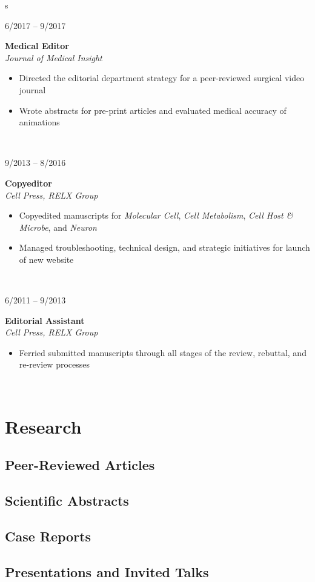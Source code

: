s\documentclass{article}
\newcommand\colleft{.20}
\newcommand\colright{.75}
\newcommand{\entryfour}[4]
	{
		\begin{minipage}[t]{\colleft\textwidth}
		\hfill \textsc{#1}
		\end{minipage}
		\hfill\vline\hfill
		\begin{minipage}[t]{\colright\textwidth}
		{\bf#2}\\
		\textit{#3}
		\footnotesize{#4}
		\end{minipage}\\
		\entryvspace
	}%
\newcommand{\entryvspace}{\vspace{0.5em}}
\begin{document}
		\entryfour{6/2017 -- 9/2017}{Medical Editor}{Journal of Medical Insight}{%
		\begin{itemize}
			\item Directed the editorial department strategy for a peer-reviewed surgical video journal
			\item Wrote abstracts for pre-print articles and evaluated medical accuracy of animations
		\end{itemize}
		}
		
		\entryfour{9/2013 -- 8/2016}{Copyeditor}{Cell Press, RELX Group}{%
			\begin{itemize}
				\item Copyedited manuscripts for \emph{Molecular Cell}, \emph{Cell Metabolism}, \emph{Cell Host \& Microbe}, and \emph{Neuron}
				\item Managed troubleshooting, technical design, and strategic initiatives for launch of new website 
			\end{itemize}
		}
		
		\entryfour{6/2011 -- 9/2013}{Editorial Assistant}{Cell Press, RELX Group}{%
			\begin{itemize}
				\item Ferried submitted manuscripts through all stages of the review, rebuttal, and re-review processes
			\end{itemize}
		}

\section*{Research}
	\nocite{*}
	\subsection*{Peer-Reviewed Articles}
		\printbibliography[keyword=article, heading=none]
	\subsection*{Scientific Abstracts}
		\printbibliography[keyword=abstract, heading=none,resetnumbers]	
	\subsection*{Case Reports}
		\printbibliography[keyword=caseRep, heading=none,resetnumbers]
  \subsection*{Presentations and Invited Talks}
	  \printbibliography[keyword=presentation, heading=none, resetnumbers]
\end{document}
